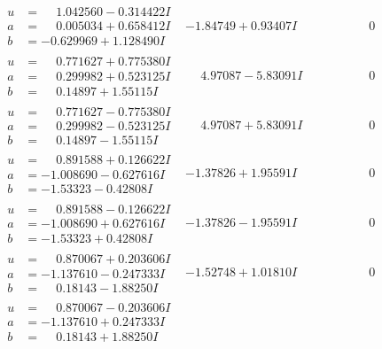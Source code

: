 \documentclass[1p]{elsarticle_modified}
\theoremstyle{definition}
\begin{document}
$$\begin{array}{c|c|c}
\begin{aligned}
u &= \phantom{-}1.042560 - 0.314422 I \\
a &= \phantom{-}0.005034 + 0.658412 I \\
b &= -0.629969 + 1.128490 I\end{aligned}
 & -1.84749 + 0.93407 I & \phantom{-0.000000 } 0 \\ \hline\begin{aligned}
u &= \phantom{-}0.771627 + 0.775380 I \\
a &= \phantom{-}0.299982 + 0.523125 I \\
b &= \phantom{-}0.14897 + 1.55115 I\end{aligned}
 & \phantom{-}4.97087 - 5.83091 I & \phantom{-0.000000 } 0 \\ \hline\begin{aligned}
u &= \phantom{-}0.771627 - 0.775380 I \\
a &= \phantom{-}0.299982 - 0.523125 I \\
b &= \phantom{-}0.14897 - 1.55115 I\end{aligned}
 & \phantom{-}4.97087 + 5.83091 I & \phantom{-0.000000 } 0 \\ \hline\begin{aligned}
u &= \phantom{-}0.891588 + 0.126622 I \\
a &= -1.008690 - 0.627616 I \\
b &= -1.53323 - 0.42808 I\end{aligned}
 & -1.37826 + 1.95591 I & \phantom{-0.000000 } 0 \\ \hline\begin{aligned}
u &= \phantom{-}0.891588 - 0.126622 I \\
a &= -1.008690 + 0.627616 I \\
b &= -1.53323 + 0.42808 I\end{aligned}
 & -1.37826 - 1.95591 I & \phantom{-0.000000 } 0 \\ \hline\begin{aligned}
u &= \phantom{-}0.870067 + 0.203606 I \\
a &= -1.137610 - 0.247333 I \\
b &= \phantom{-}0.18143 - 1.88250 I\end{aligned}
 & -1.52748 + 1.01810 I & \phantom{-0.000000 } 0 \\ \hline\begin{aligned}
u &= \phantom{-}0.870067 - 0.203606 I \\
a &= -1.137610 + 0.247333 I \\
b &= \phantom{-}0.18143 + 1.88250 I\end{aligned}

\end{array}$$
\end{document}
